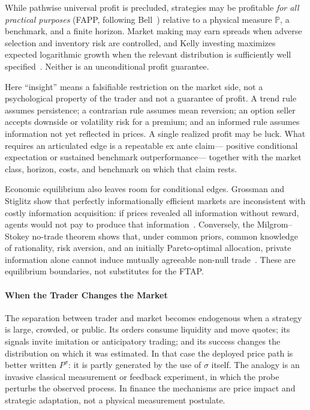 \documentclass[aps,pra,reprint,superscriptaddress,amsmath,amssymb,floatfix]{revtex4-2}
\theoremstyle{plain}
\theoremstyle{definition}
\theoremstyle{remark}
\begin{document}
While pathwise universal profit is precluded, strategies may be profitable
\emph{for all practical purposes} (FAPP, following Bell~\cite{bell-a})
relative to a physical measure \(\mathbb{P}\), a benchmark, and a finite
horizon. Market making may earn spreads when adverse selection and inventory
risk are controlled, and Kelly investing maximizes expected logarithmic
growth when the relevant distribution is sufficiently well
specified~\cite{Kelly1956}. Neither is an unconditional profit guarantee.

Here ``insight'' means a falsifiable restriction on the market side, not a
psychological property of the trader and not a guarantee of profit. A trend
rule assumes persistence; a contrarian rule assumes mean reversion; an option
seller accepts downside or volatility risk for a premium; and an informed rule
assumes information not yet reflected in prices. A single realized profit may
be luck. What requires an articulated edge is a repeatable ex ante claim---
positive conditional expectation or sustained benchmark outperformance---
together with the market class, horizon, costs, and benchmark on which that
claim rests.

Economic equilibrium also leaves room for conditional edges. Grossman and
Stiglitz show that perfectly informationally efficient markets are
inconsistent with costly information acquisition: if prices revealed all
information without reward, agents would not pay to produce that
information~\cite{GrossmanStiglitz1980}. Conversely, the Milgrom--Stokey
no-trade theorem shows that, under common priors, common knowledge of
rationality, risk aversion, and an initially Pareto-optimal allocation, private
information alone cannot induce mutually agreeable non-null
trade~\cite{MilgromStokey1982}. These are equilibrium boundaries, not
substitutes for the FTAP.

\paragraph{When the Trader Changes the Market}

The separation between trader and market becomes endogenous when a strategy is
large, crowded, or public. Its orders consume liquidity and move quotes; its
signals invite imitation or anticipatory trading; and its success changes the
distribution on which it was estimated. In that case the deployed price path
is better written \(P^\sigma\): it is partly generated by the use of
\(\sigma\) itself. The analogy is an invasive classical measurement or
feedback experiment, in which the probe perturbs the observed process. In
finance the mechanisms are price impact and strategic adaptation, not a
physical measurement postulate.
\end{document}
